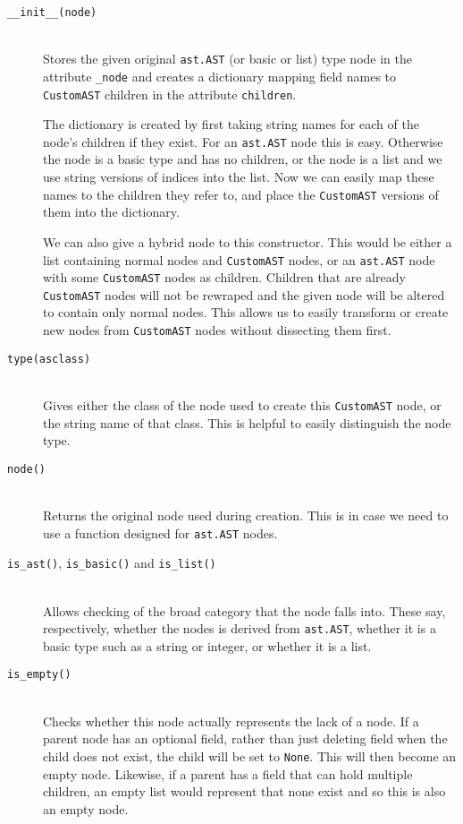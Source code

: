 \documentclass{report}
\begin{document}
\begin{description}
\item[\texttt{\_\_init\_\_(node)}] \hfill \\
Stores the given original \texttt{ast.AST} (or basic or list) type node in the attribute \texttt{\_node} and creates a dictionary mapping field names
to \texttt{CustomAST} children in the attribute \texttt{children}.

The dictionary is created by first taking string names for each of the node's children if they exist. For an \texttt{ast.AST} node this is easy.
Otherwise the node is a basic type and has no children, or the node is a list and we use string versions of indices into the list. Now we can
easily map these names to the children they refer to, and place the \texttt{CustomAST} versions of them into the dictionary.

We can also give a hybrid node to this constructor. This would be either a list containing normal nodes and \texttt{CustomAST} nodes, or an
\texttt{ast.AST} node with some \texttt{CustomAST} nodes as children. Children that are already \texttt{CustomAST} nodes will not be rewraped
and the given node will be altered to contain only normal nodes. This allows us to easily transform or create new nodes from \texttt{CustomAST}
nodes without dissecting them first.

\item[\texttt{type(asclass)}] \hfill \\
Gives either the class of the node used to create this \texttt{CustomAST} node, or the string name of that class. This is helpful to easily distinguish
the node type.

\item[\texttt{node()}] \hfill \\
Returns the original node used during creation. This is in case we need to use a function designed for \texttt{ast.AST} nodes.

\item[\texttt{is\_ast()}, \texttt{is\_basic()} and \texttt{is\_list()}] \hfill \\
Allows checking of the broad category that the node falls into. These say, respectively, whether the nodes is derived from \texttt{ast.AST}, whether
it is a basic type such as a string or integer, or whether it is a list.

\item[\texttt{is\_empty()}] \hfill \\
Checks whether this node actually represents the lack of a node. If a parent node has an optional field, rather than just deleting field when the child does
not exist, the child will be set to \texttt{None}. This will then become an empty node. Likewise, if a parent has a field that can hold multiple children, an
empty list would represent that none exist and so this is also an empty node.


\end{description}
\end{document}
